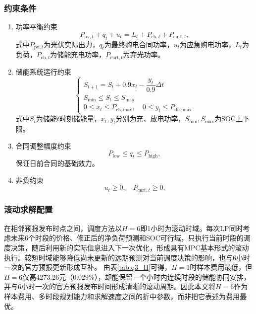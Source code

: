 \subsubsection{约束条件}
\begin{enumerate}
\item 功率平衡约束
\begin{equation}
P_{\mathrm{pv},t}+q_t+u_t=L_t+P_{\mathrm{ch},t}+P_{\mathrm{curt},t},
\label{eq:q3_power_balance}
\end{equation}
式中$P_{\mathrm{pv},t}$为光伏实际出力，$q_t$为最终购电合同功率，$u_t$为应急购电功率，$L_t$为负荷，$P_{\mathrm{ch},t}$为储能充电功率，$P_{\mathrm{curt},t}$为弃光功率。
\item 储能系统运行约束
\begin{equation}
\begin{cases}
S_{t+1}=S_t+0.9x_t-\dfrac{y_t}{0.9}\Delta t\\
S_{\min}\le S_t\le S_{\max}\\
0\le x_t\le P_{\mathrm{ch,max}},\quad 0\le y_t\le P_{\mathrm{dis,max}}
\end{cases}
\label{eq:q3_bess}
\end{equation}
式中$S_t$为储能$t$时刻储能量，$x_t,y_t$分别为充、放电功率，$S_{\min},S_{\max}$为SOC上下限。
\item 合同调整幅度约束
\begin{equation}
P_{\mathrm{low}}\le q_t\le P_{\mathrm{high}},
\label{eq:q3_adj_limit}
\end{equation}
保证日前合同的基础效力。
\item 非负约束
\begin{equation}
u_t\ge0,\quad P_{\mathrm{curt},t}\ge0.
\label{eq:q3_nonneg}
\end{equation}
\end{enumerate}

\subsubsection{滚动求解配置}
在相邻预报发布时点之间，调度方法以$H=6$即1小时为滚动时域。每次LP同时考虑未来6个时段的价格、修正后的净负荷预测和SOC可行域，只执行当前时段的调度决策，随后利用新的实际信息进入下一次优化，形成具有MPC基本形式的滚动执行。较短时域能够降低尚未更新的远期预测对当前调度决策的影响，也与6小时一次的官方预报更新形成互补。
由表\ref{tab:q3_H}可得，$H=1$时样本费用最低，但$H=6$仅高4273.26元（0.029\%），却能保留一个小时内连续时段的储能协同安排，并与6小时一次的官方预报发布时间形成清晰的滚动周期。因此本文将$H=6$作为样本费用、多时段规划能力和求解速度之间的折中参数，而非把它表述为费用最优。

